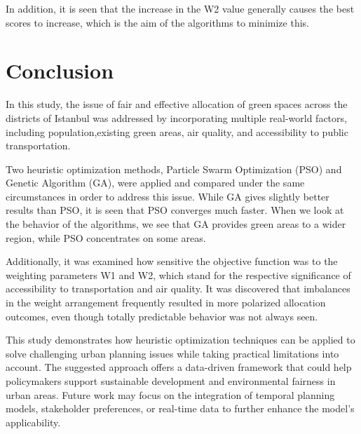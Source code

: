 \documentclass[conference]{IEEEtran}
\begin{document}
In addition, it is seen that the increase in the W2 value generally causes the best scores to increase, which is the aim of the algorithms to minimize this.

\section{Conclusion}
In this study, the issue of fair and effective allocation of green spaces across the districts of Istanbul was addressed by incorporating multiple real-world factors, including population,existing green areas, air quality, and accessibility to public transportation.

Two heuristic optimization methods, Particle Swarm Optimization (PSO) and Genetic Algorithm (GA), were applied and compared under the same circumstances in order to address this issue. While GA gives slightly better results than PSO, it is seen that PSO converges much faster. When we look at the behavior of the algorithms, we see that GA provides green areas to a wider region, while PSO concentrates on some areas.

Additionally, it was examined how sensitive the objective function was to the weighting parameters W1 and W2, which stand for the respective significance of accessibility to transportation and air quality. It was discovered that imbalances in the weight arrangement frequently resulted in more polarized allocation outcomes, even though totally predictable behavior was not always seen.

This study demonstrates how heuristic optimization techniques can be applied to solve challenging urban planning issues while taking practical limitations into account. The suggested approach offers a data-driven framework that could help policymakers support sustainable development and environmental fairness in urban areas. Future work may focus on the integration of temporal planning models, stakeholder preferences, or real-time data to further enhance the model’s applicability.
\end{document}
